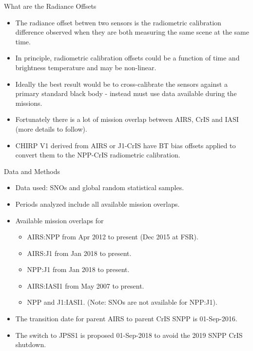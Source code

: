 \documentclass[10pt,t]{beamer}
\begin{document}
\begin{frame}{What are the Radiance Offsets}

  \begin{itemize}
  \item The radiance offset betwen two sensors is the radiometric calibration
    difference observed when they are both measuring the same scene at the same time.
  \item In principle, radiometric calibration offsets could be a function of time and
    brightness temperature and may be non-linear.
  \item Ideally the best result would be to cross-calibrate the sensors against a primary
    standard black body - instead must use data available during the missions.
  \item Fortunately there is a lot of mission overlap between AIRS, CrIS and IASI
    (more details to follow).
  \item CHIRP V1 derived from AIRS or J1-CrIS have BT bias offsets applied to convert them to the NPP-CrIS radiometric calibration.

  \end{itemize}

\end{frame}

\begin{frame}{Data and Methods}

  \begin{itemize}
    \item Data used: SNOs and global random statistical samples.
    \item Periods analyzed include all available mission overlaps.
    \item Available mission overlaps for
      \begin{itemize}
      \item AIRS:NPP from Apr 2012 to present (Dec 2015 at FSR).
      \item AIRS:J1 from Jan 2018 to present.
      \item NPP:J1 from Jan 2018 to present.
      \item AIRS:IASI1 from May 2007 to present.
      \item NPP and J1:IASI1. (Note: SNOs are not available for NPP:J1).
      \end{itemize}
      
    \item The transition date for parent AIRS to parent CrIS SNPP is 01-Sep-2016.
    \item The switch to JPSS1 is proposed 01-Sep-2018 to avoid the 2019 SNPP CrIS
      shutdown.

  \end{itemize}
\end{frame}
\end{document}
